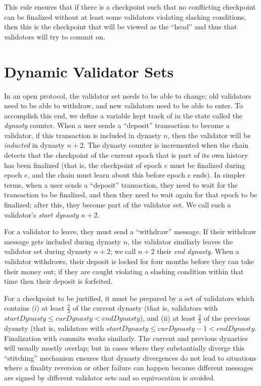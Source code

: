 \documentclass[12pt]{article}
\begin{document}
This rule ensures that if there is a checkpoint such that no conflicting checkpoint can be finalized without at least some validators violating slashing conditions, then this is the checkpoint that will be viewed as the ``head'' and thus that validators will try to commit on.

\section{Dynamic Validator Sets}

In an open protocol, the validator set needs to be able to change; old validators need to be able to withdraw, and new validators need to be able to enter. To accomplish this end, we define a variable kept track of in the state called the \textit{dynasty} counter. When a user sends a ``deposit'' transaction to become a validator, if this transaction is included in dynasty $n$, then the validator will be \textit{inducted} in dynasty $n+2$. The dynasty counter is incremented when the chain detects that the checkpoint of the current epoch that is part of its own history has been finalized (that is, the checkpoint of epoch $e$ must be finalized during epoch $e$, and the chain must learn about this before epoch $e$ ends). In simpler terms, when a user sends a ``deposit'' transaction, they need to wait for the transaction to be finalized, and then they need to wait again for that epoch to be finalized; after this, they become part of the validator set. We call such a validator's \textit{start dynasty} $n+2$.

For a validator to leave, they must send a ``withdraw'' message. If their withdraw message gets included during dynasty $n$, the validator similarly leaves the validator set during dynasty $n+2$; we call $n+2$ their \textit{end dynasty}. When a validator withdraws, their deposit is locked for four months before they can take their money out; if they are caught violating a slashing condition within that time then their deposit is forfeited.

For a checkpoint to be justified, it must be prepared by a set of validators which contains (i) at least $\frac{2}{3}$ of the current dynasty (that is, validators with $startDynasty \le curDynasty < endDynasty$), and (ii) at least $\frac{2}{3}$ of the previous dyansty (that is, validators with $startDynasty \le curDynasty - 1 < endDynasty$. Finalization with commits works similarly. The current and previous dynasties will usually mostly overlap; but in cases where they substantially diverge this ``stitching'' mechanism ensures that dynasty divergences do not lead to situations where a finality reversion or other failure can happen because different messages are signed by different validator sets and so equivocation is avoided.
\end{document}
